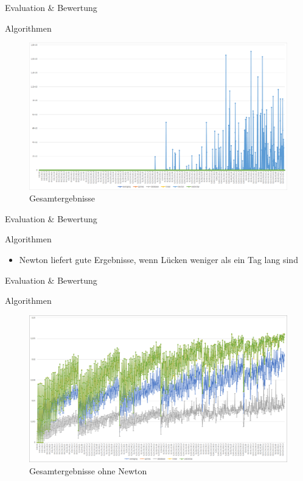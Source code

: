 \begin{frame}{Evaluation \& Bewertung}
\begin{block}{Algorithmen}
\begin{figure}
	\centering
	\includegraphics[width=1\textwidth]{pics/evaluation-algorithms-1.png}
	\caption{Gesamtergebnisse}
\end{figure}
\end{block}
\end{frame}

\begin{frame}{Evaluation \& Bewertung}
\begin{block}{Algorithmen}
\begin{itemize}
	\item Newton liefert gute Ergebnisse, wenn Lücken weniger als ein Tag lang sind
\end{itemize}
\end{block}
\end{frame}

\begin{frame}{Evaluation \& Bewertung}
\begin{block}{Algorithmen}
\begin{figure}
	\centering
	\includegraphics[width=1\textwidth]{pics/evaluation-algorithms-2.png}
	\caption{Gesamtergebnisse ohne Newton}
\end{figure}
\end{block}
\end{frame}

